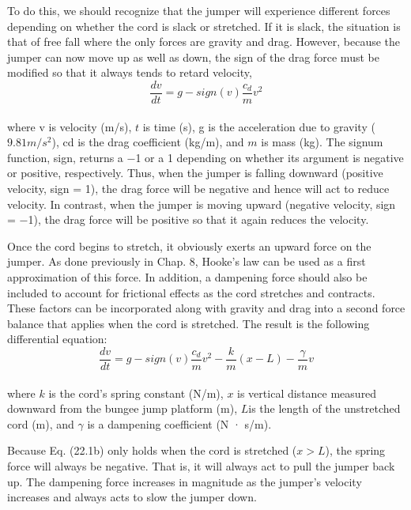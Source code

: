 \documentclass[../main.tex]{subfiles}
\begin{document}
To do this, we should recognize that the jumper will experience different forces depending on whether the cord is slack or stretched. If it is slack, the situation is that of free
fall where the only forces are gravity and drag. However, because the jumper can now
move up as well as down, the sign of the drag force must be modified so that it always tends
to retard velocity,
\begin{equation}
\tag{22.1a}
\dfrac{dv}{dt} = g - sign(v)\dfrac{c_{d}}{m}v^2
\end{equation}\\
where v is velocity (m/s), $t$ is time (s), g is the acceleration due to gravity ($9.81 m/s^2$), cd is
the drag coefficient (kg/m), and $m$ is mass (kg). The signum function\footnotemark, sign, returns a −1 or
a 1 depending on whether its argument is negative or positive, respectively. Thus, when the
jumper is falling downward (positive velocity, sign = 1), the drag force will be negative
and hence will act to reduce velocity. In contrast, when the jumper is moving upward
(negative velocity, sign = −1), the drag force will be positive so that it again reduces the
velocity.


Once the cord begins to stretch, it obviously exerts an upward force on the jumper. As
done previously in Chap. 8, Hooke's law can be used as a first approximation of this force.
In addition, a dampening force should also be included to account for frictional effects as
the cord stretches and contracts. These factors can be incorporated along with gravity and
drag into a second force balance that applies when the cord is stretched. The result is the
following differential equation:
\begin{equation}
\tag{22.1b}
\dfrac{dv}{dt} = g - sign(v) \dfrac{c_{d}}{m} v^2 - \dfrac{k}{m} (x-L) - \dfrac{\gamma}{m}v
\end{equation}\\
where $k$ is the cord's spring constant (N/m), $x$ is vertical distance measured downward from
the bungee jump platform (m), $L $is the length of the unstretched cord (m), and $\gamma$ is a dampening coefficient (N · s/m).

Because Eq. (22.1b) only holds when the cord is stretched ($x > L$), the spring force
will always be negative. That is, it will always act to pull the jumper back up. The dampening force increases in magnitude as the jumper's velocity increases and always acts to
slow the jumper down.
\end{document}
